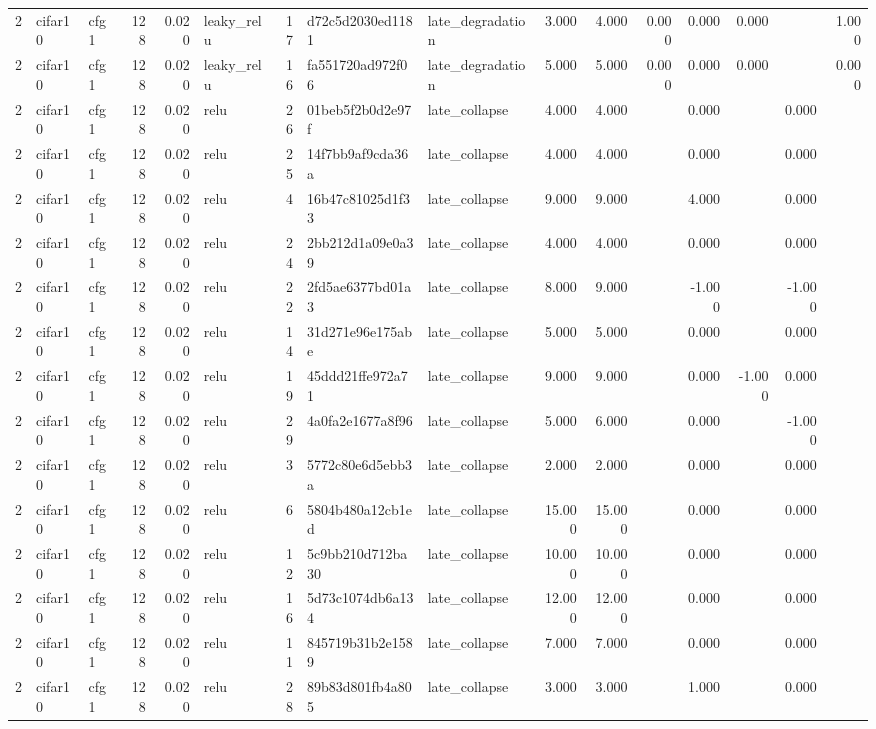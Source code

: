 \begin{table}[htbp]
{\begin{tabular}{@{}rllrrlrllrrrrrrr@{}}
2 & cifar10 & cfg1 & 128 & 0.020 & leaky\_relu & 17 & d72c5d2030ed1181 & late\_degradation & 3.000 & 4.000 & 0.000 & 0.000 & 0.000 &  & 1.000 \\
2 & cifar10 & cfg1 & 128 & 0.020 & leaky\_relu & 16 & fa551720ad972f06 & late\_degradation & 5.000 & 5.000 & 0.000 & 0.000 & 0.000 &  & 0.000 \\
2 & cifar10 & cfg1 & 128 & 0.020 & relu & 26 & 01beb5f2b0d2e97f & late\_collapse & 4.000 & 4.000 &  & 0.000 &  & 0.000 &  \\
2 & cifar10 & cfg1 & 128 & 0.020 & relu & 25 & 14f7bb9af9cda36a & late\_collapse & 4.000 & 4.000 &  & 0.000 &  & 0.000 &  \\
2 & cifar10 & cfg1 & 128 & 0.020 & relu & 4 & 16b47c81025d1f33 & late\_collapse & 9.000 & 9.000 &  & 4.000 &  & 0.000 &  \\
2 & cifar10 & cfg1 & 128 & 0.020 & relu & 24 & 2bb212d1a09e0a39 & late\_collapse & 4.000 & 4.000 &  & 0.000 &  & 0.000 &  \\
2 & cifar10 & cfg1 & 128 & 0.020 & relu & 22 & 2fd5ae6377bd01a3 & late\_collapse & 8.000 & 9.000 &  & -1.000 &  & -1.000 &  \\
2 & cifar10 & cfg1 & 128 & 0.020 & relu & 14 & 31d271e96e175abe & late\_collapse & 5.000 & 5.000 &  & 0.000 &  & 0.000 &  \\
2 & cifar10 & cfg1 & 128 & 0.020 & relu & 19 & 45ddd21ffe972a71 & late\_collapse & 9.000 & 9.000 &  & 0.000 & -1.000 & 0.000 &  \\
2 & cifar10 & cfg1 & 128 & 0.020 & relu & 29 & 4a0fa2e1677a8f96 & late\_collapse & 5.000 & 6.000 &  & 0.000 &  & -1.000 &  \\
2 & cifar10 & cfg1 & 128 & 0.020 & relu & 3 & 5772c80e6d5ebb3a & late\_collapse & 2.000 & 2.000 &  & 0.000 &  & 0.000 &  \\
2 & cifar10 & cfg1 & 128 & 0.020 & relu & 6 & 5804b480a12cb1ed & late\_collapse & 15.000 & 15.000 &  & 0.000 &  & 0.000 &  \\
2 & cifar10 & cfg1 & 128 & 0.020 & relu & 12 & 5c9bb210d712ba30 & late\_collapse & 10.000 & 10.000 &  & 0.000 &  & 0.000 &  \\
2 & cifar10 & cfg1 & 128 & 0.020 & relu & 16 & 5d73c1074db6a134 & late\_collapse & 12.000 & 12.000 &  & 0.000 &  & 0.000 &  \\
2 & cifar10 & cfg1 & 128 & 0.020 & relu & 11 & 845719b31b2e1589 & late\_collapse & 7.000 & 7.000 &  & 0.000 &  & 0.000 &  \\
2 & cifar10 & cfg1 & 128 & 0.020 & relu & 28 & 89b83d801fb4a805 & late\_collapse & 3.000 & 3.000 &  & 1.000 &  & 0.000 &  \\

\end{tabular}}
\end{table}
